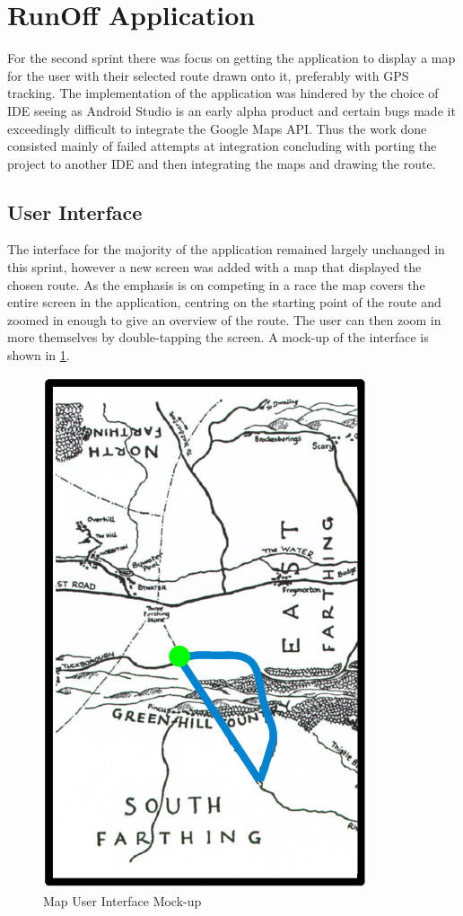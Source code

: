\section{RunOff Application}
For the second sprint there was focus on getting the application to display a map for the user with their selected route drawn onto it, preferably with \ac{GPS} tracking. The implementation of the application was hindered by the choice of \ac{IDE} seeing as Android Studio is an early alpha product and certain bugs made it exceedingly difficult to integrate the Google Maps \ac{API}. Thus the work done consisted mainly of failed attempts at integration concluding with porting the project to another \ac{IDE} and then integrating the maps and drawing the route.

\subsection{User Interface}
The interface for the majority of the application remained largely unchanged in this sprint, however a new screen was added with a map that displayed the chosen route. As the emphasis is on competing in a race the map covers the entire screen in the application, centring on the starting point of the route and zoomed in enough to give an overview of the route. The user can then zoom in more themselves by double-tapping the screen. A mock-up of the interface is shown in \ref{fig:mapMock}.

\begin{figure}[ht]
\begin{center}
 \caption{Map User Interface Mock-up}
 \label{fig:mapMock}
 \includegraphics[scale=0.4]{img/mapMock.png}
\end{center}
\end{figure}

